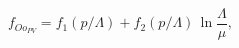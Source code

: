 \begin{equation}
f_{Oo_{PV}} = f_1(p/\Lambda) + f_2(p/\Lambda)\,\ln\frac{\Lambda}{\mu},
\end{equation}

